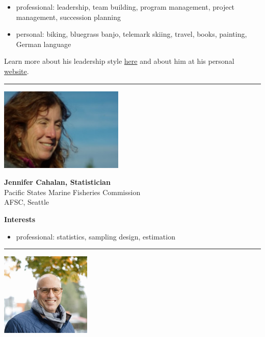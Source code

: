 \documentclass[
  letterpaper,
  DIV=11,
  numbers=noendperiod]{scrreprt}
\providecommand{\tightlist}{%
  \setlength{\itemsep}{0pt}\setlength{\parskip}{0pt}}\usepackage{longtable,booktabs,array}
\begin{document}
\begin{itemize}
\tightlist
\item
  professional: leadership, team building, program management, project
  management, succession planning\\
\item
  personal: biking, bluegrass banjo, telemark skiing, travel, books,
  painting, German language
\end{itemize}

Learn more about his leadership style \href{jjphilosophy.qmd}{here} and
about him at his personal \href{https://jjannot.github.io/}{website}.

\begin{center}\rule{0.5\linewidth}{0.5pt}\end{center}

\includegraphics[width=\textwidth,height=1.5625in]{_img/JenCahalan.jpg}

\textbf{Jennifer Cahalan, Statistician}\\
Pacific States Marine Fisheries Commission\\
AFSC, Seattle

\textbf{Interests}

\begin{itemize}
\tightlist
\item
  professional: statistics, sampling design, estimation
\end{itemize}

\begin{center}\rule{0.5\linewidth}{0.5pt}\end{center}

\includegraphics[width=\textwidth,height=1.5625in]{_img/CraigFaunce.jpg}
\end{document}
